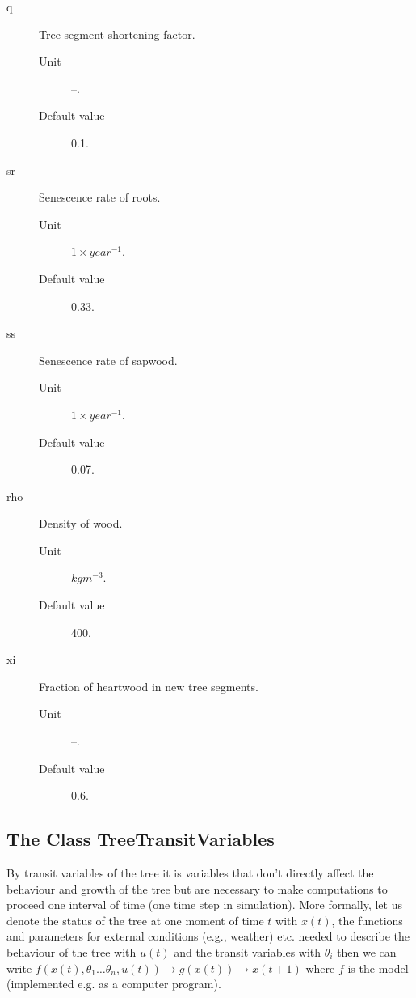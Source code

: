 \begin{description}
\begin{description}
       \end{description}
  \item[q] Tree segment shortening factor.
       \begin{description}
         \item[Unit] --.
         \item[Default value] 0.1.
       \end{description}
  \item[sr] Senescence rate of roots.
       \begin{description}
         \item[Unit] $1 \times year^{-1}$.
         \item[Default value]  0.33.
       \end{description}
  \item[ss] Senescence rate of sapwood.  
       \begin{description}
         \item[Unit] $1 \times year^{-1}$.
         \item[Default value] 0.07.
       \end{description}
  \item[rho] Density of wood. 
       \begin{description}
         \item[Unit] $kgm^{-3}$. 
         \item[Default value] 400.
       \end{description}
  \item[xi] Fraction of heartwood in new tree segments. 
        \begin{description}
          \item[Unit] --.
          \item[Default value] 0.6.
        \end{description}
\end{description}

\subsection{The Class TreeTransitVariables}

By transit variables of the tree it is variables that don't directly
affect the behaviour and growth of the tree but are necessary to make
computations to proceed one interval of time (one time step in
simulation). More formally, let us denote the status of the tree at
one moment of time $ t $ with $ x(t)$, the functions and parameters
for external conditions (e.g., weather) etc. needed to describe the
behaviour of the tree with $ u(t) $ and the transit variables with $
\theta_{i} $ then we can write $ f(x(t),\theta_{1}\ldots\theta_{n},
u(t)) \rightarrow g(x(t)) \rightarrow x(t+1) $ where $ f $ is the
model (implemented e.g. as a computer program).


